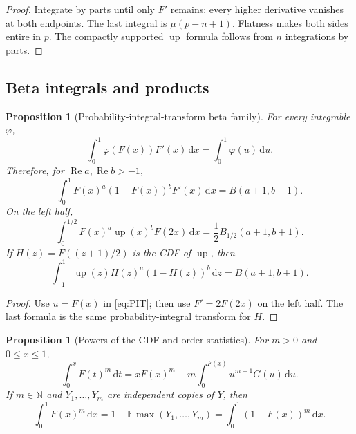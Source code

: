 \documentclass[11pt]{article}
\newtheorem{proposition}[theorem]{Proposition}
\theoremstyle{definition}
\theoremstyle{remark}
\newcommand{\N}{\mathbb N}
\newcommand{\E}{\mathbb E}
\newcommand{\dd}{\,\mathrm d}
\newcommand{\Up}{\operatorname{up}}
\newcommand{\Ree}{\operatorname{Re}}
\begin{document}
\begin{proof}
Integrate by parts until only $F'$ remains; every higher derivative vanishes at both endpoints.
The last integral is $\mu(p-n+1)$.  Flatness makes both sides entire in $p$.  The compactly
supported $\Up$ formula follows from $n$ integrations by parts.
\end{proof}

\subsection{Beta integrals and products}

\begin{proposition}[Probability-integral-transform beta family]
\label{prop:beta-family}
For every integrable $\varphi$,
\begin{equation}
 \int_0^1\varphi(F(x))F'(x)\dd x=\int_0^1\varphi(u)\dd u.
 \label{eq:PIT}
\end{equation}
Therefore, for $\Ree a,\Ree b>-1$,
\begin{equation}
 \int_0^1F(x)^a(1-F(x))^bF'(x)\dd x
 =B(a+1,b+1).
 \label{eq:beta-F}
\end{equation}
On the left half,
\begin{equation}
 \int_0^{1/2}F(x)^a\Up(x)^bF(2x)\dd x
 =\frac12B_{1/2}(a+1,b+1).
 \label{eq:incomplete-beta-left}
\end{equation}
If $H(z)=F((z+1)/2)$ is the CDF of $\Up$, then
\begin{equation}
 \int_{-1}^{1}\Up(z)H(z)^a(1-H(z))^b\dd z
 =B(a+1,b+1).
 \label{eq:beta-up-CDF}
\end{equation}
\end{proposition}

\begin{proof}
Use $u=F(x)$ in \cref{eq:PIT}; then use $F'=2F(2x)$ on the left half.  The last formula is
the same probability-integral transform for $H$.
\end{proof}

\begin{proposition}[Powers of the CDF and order statistics]
\label{prop:CDF-powers}
For $m>0$ and $0\le x\le1$,
\begin{equation}
 \int_0^xF(t)^m\dd t
 =xF(x)^m-m\int_0^{F(x)}u^{m-1}G(u)\dd u.
 \label{eq:CDF-power-primitive}
\end{equation}
If $m\in\N$ and $Y_1,\ldots,Y_m$ are independent copies of $Y$, then
\begin{equation}
 \int_0^1F(x)^m\dd x
 =1-\E\max(Y_1,\ldots,Y_m)
 =\int_0^1(1-F(x))^m\dd x.
 \label{eq:CDF-power-order-stat}
\end{equation}
\end{proposition}
\end{document}
